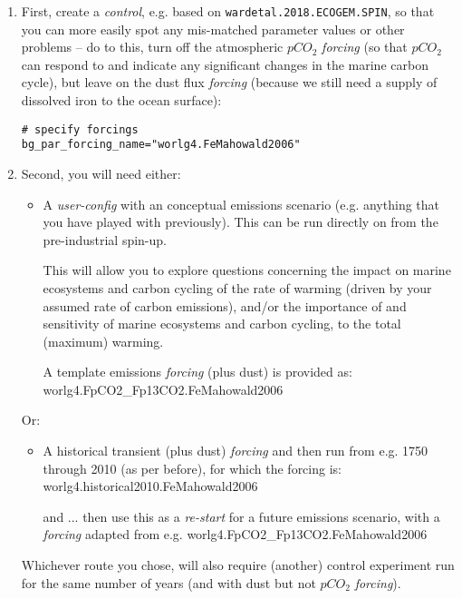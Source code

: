 \documentclass[11pt,fleqn]{book} %
\begin{document}
\begin{enumerate}[noitemsep]

\vspace{1mm}
\item First, create a \textit{control}, e.g. based on \texttt{wardetal.2018.ECOGEM.SPIN}, so that you can more easily spot any mis-matched parameter values or other problems -- do to this, turn off the atmospheric \(pCO_{2}\) \textit{forcing} (so that \(pCO_{2}\) can respond to and indicate any significant changes in the marine carbon cycle), but leave on the dust flux \textit{forcing} (because we still need a supply of dissolved iron to the ocean surface):
\vspace{-1mm}\small\begin{verbatim}
# specify forcings
bg_par_forcing_name="worlg4.FeMahowald2006"
\end{verbatim}\normalsize\vspace{-1mm}

\vspace{1mm}
\item Second, you will need either:
\begin{itemize}[noitemsep]
\item A \textit{user-config} with an conceptual emissions scenario (e.g. anything that you have played with previously). This can be run directly on from the pre-industrial spin-up.

This will allow you to explore questions concerning the impact on marine ecosystems and carbon cycling of the rate of warming (driven by your assumed rate of carbon emissions), and/or the importance of and sensitivity of marine ecosystems and carbon cycling, to the total (maximum) warming.

A template emissions \textit{forcing} (plus dust) is provided as:
\\\textsf{\footnotesize worlg4.FpCO2\_Fp13CO2.FeMahowald2006}

\end{itemize}

Or:

\begin{itemize}[noitemsep]
\item A historical transient (plus dust) \textit{forcing} and then run from e.g. 1750 through 2010 (as per before), for which the forcing is:
\\\textsf{\footnotesize worlg4.historical2010.FeMahowald2006}

and ... then use this as a \textit{re-start} for a future emissions scenario,  with a \textit{forcing} adapted from e.g. \textsf{\footnotesize worlg4.FpCO2\_Fp13CO2.FeMahowald2006}
\end{itemize}

\vspace{1mm}
Whichever route you chose, will also require (another) control experiment run for the same number of years (and with dust but not \(pCO_{2}\) \textit{forcing}).
\end{enumerate}
\end{document}
